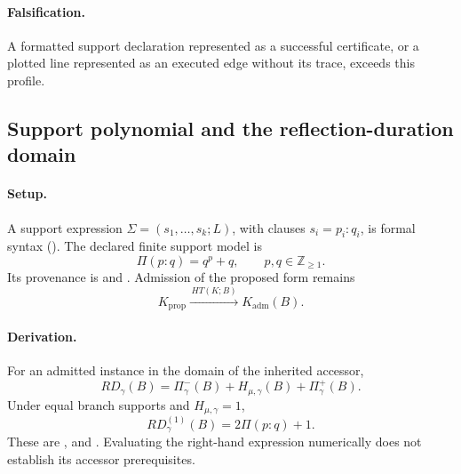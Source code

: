 \paragraph{Falsification.}
A formatted support declaration represented as a successful certificate, or a plotted line represented as an executed edge without its trace, exceeds this profile.


\subsection{Support polynomial and the reflection-duration domain}\label{subsec:curling-curl-rd}
\paragraph{Setup.}
A support expression \(\Sigma=(s_1,\ldots,s_k;L)\), with clauses \(s_i=p_i{:}q_i\), is formal syntax (). The declared finite support model is
\begin{equation}
\Pi(p{:}q)=q^p+q,\qquad p,q\in\mathbb Z_{\ge1}.
\label{eq:matter1-pi-support}
\end{equation}
Its provenance is  and . Admission of the proposed form remains
\begin{equation}
K_{\mathrm{prop}}\xrightarrow{\,HT(K;B)\,}K_{\mathrm{adm}}(B).
\label{eq:matter1-traced-admission}
\end{equation}

\paragraph{Derivation.}
For an admitted instance in the domain of the inherited accessor,
\begin{equation}
RD_\gamma(B)=\Pi^-_\gamma(B)+H_{\mu,\gamma}(B)+\Pi^+_\gamma(B).
\label{eq:matter1-rd-general}
\end{equation}
Under equal branch supports and \(H_{\mu,\gamma}=1\),
\begin{equation}
RD^{(1)}_\gamma(B)=2\Pi(p{:}q)+1.
\label{eq:matter1-rd-single-hinge}
\end{equation}
These are ,  and . Evaluating the right-hand expression numerically does not establish its accessor prerequisites.

